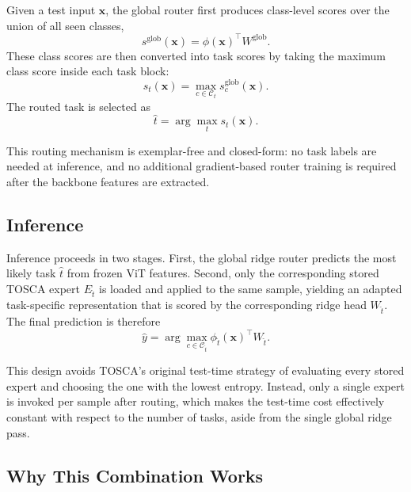 \documentclass{article}
\begin{document}
Given a test input \(\mathbf{x}\), the global router first produces
class-level scores over the union of all seen classes,
\begin{equation}
    s^{\mathrm{glob}}(\mathbf{x}) = \phi(\mathbf{x})^\top W^{\mathrm{glob}}.
\end{equation}
These class scores are then converted into task scores by taking the maximum
class score inside each task block:
\begin{equation}
    s_t(\mathbf{x}) =
    \max_{c \in \mathcal{C}_t} s^{\mathrm{glob}}_c(\mathbf{x}).
\end{equation}
The routed task is selected as
\begin{equation}
    \hat{t} = \arg\max_t s_t(\mathbf{x}).
\end{equation}

This routing mechanism is exemplar-free and closed-form: no task labels are
needed at inference, and no additional gradient-based router training is
required after the backbone features are extracted.

\subsection{Inference}
\label{subsec:method-inference}

Inference proceeds in two stages. First, the global ridge router predicts the
most likely task \(\hat{t}\) from frozen ViT features. Second, only the
corresponding stored TOSCA expert \(E_{\hat{t}}\) is loaded and applied to
the same sample, yielding an adapted task-specific representation that is
scored by the corresponding ridge head \(W_{\hat{t}}\). The final prediction
is therefore
\begin{equation}
    \hat{y} =
    \arg\max_{c \in \mathcal{C}_{\hat{t}}}
    \phi_{\hat{t}}(\mathbf{x})^\top W_{\hat{t}}.
\end{equation}

This design avoids TOSCA's original test-time strategy of evaluating every
stored expert and choosing the one with the lowest entropy. Instead, only a
single expert is invoked per sample after routing, which makes the test-time
cost effectively constant with respect to the number of tasks, aside from the
single global ridge pass.

\subsection{Why This Combination Works}
\label{subsec:method-discussion}
\end{document}
